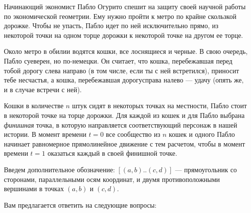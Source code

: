 ﻿

\ms Начинающий экономист Пабло Огурито спешит на защиту своей научной работы по экономической геометрии. Ему нужно пройти к метро по крайне скользкой дорожке. Чтобы не упасть, Пабло идет по ней исключительно прямо, из некоторой точки на одном торце дорожки к некоторой точке на другом ее торце.

\ms Около метро в обилии водятся кошки, все лоснящиеся и черные. В свою очередь, Пабло суеверен, но по-немецки. Он считает, что кошка, перебежавшая перед тобой дорогу слева направо (в том числе, если ты с ней встретился), приносит тебе несчастья, а кошка, перебежавшая дорогу\linebreak справа налево — удачу (опять же, и в случае встречи с ней).

\ms Кошки в количестве $n$ штук сидят в некоторых точках на местности, Пабло стоит в некоторой точке на торце дорожки. Для каждой из кошек и для Пабло выбрана {\itshape финишная} точка, в которую направляется соответствующий персонаж в нашей истории. В момент времени $t=0$ все сообщество из $n$ кошек и одного Пабло начинает равномерное прямолинейное движение с тем расчетом, чтобы в момент времени $t=1$ оказаться каждый в своей финишной точке.

\ms Введем дополнительное обозначение: $[(a,b)..(c,d)]$ --- прямоугольник со сторонами, параллельными осям координат, и двумя противоположными вершинами в точках $(a,b)$ и $(c,d)$.

\ms Вам предлагается ответить на следующие вопросы:


